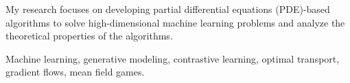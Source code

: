 

\begin{cvparagraph}


My research focuses on developing partial differential equations (PDE)-based algorithms to solve high-dimensional machine learning problems and analyze the theoretical properties of the algorithms.

Machine learning, generative modeling, contrastive learning, optimal transport, gradient flows, mean field games.

\end{cvparagraph}